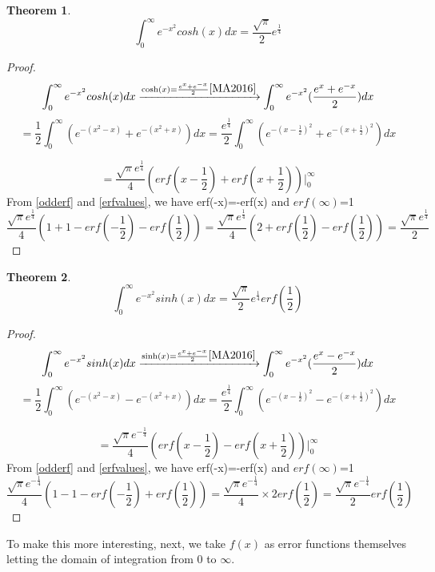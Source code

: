 \documentclass[a4paper,twoside,10pt]{article}
\newtheorem{theorem}{Theorem}[section]
\begin{document}
 \begin{theorem}
\begin{equation}
 \int_0^{\infty} e^{-x^2} cosh(x) dx = \frac{\sqrt{\pi}}{2} e^{\frac{1}{4}}    
\end{equation}
\end{theorem}
\begin{proof}
 \[ \int_0^{\infty} e^{-x^2} cosh(x) dx \xrightarrow{ \cosh(x)=\frac{e^x+e^{-x}}{2} \cite{MA2016}}  \int_0^{\infty} e^{-x^2}(\frac{e^{x}+e^{-x}}{2}) dx  \]
 \[=\frac{1}{2} \int_0^{ \infty} \left( e^{-(x^2-x)}+ e^{-(x^2+x)} \right) dx = \frac{e^{\frac{1}{4}}}{2} \int_0^{ \infty} \left( e^{-(x-\frac{1}{2})^2}+ e^{-(x+\frac{1}{2})^2} \right) dx \]

\[ =\frac{\sqrt{\pi}e^{\frac{1}{4}}}{4}  \left( erf(x-\frac{1}{2}) + erf(x+\frac{1}{2}) \right) \Big|_0^{\infty} \] 
From \eqref{odderf} and   \eqref{erfvalues}, we have erf(-x)=-erf(x)  and     $erf(\infty)  $=1 
 \[\frac{\sqrt{\pi} e^{\frac{1}{4}} }{4}  \left( 1+ 1 - erf(-\frac{1}{2})-erf(\frac{1}{2}) \right) = \frac{\sqrt{\pi} e^{\frac{1}{4}} }{4}  \left( 2 + erf(\frac{1}{2})-erf(\frac{1}{2}) \right) = \frac{\sqrt{\pi} e^{\frac{1}{4}} }{2}   \]
\end{proof}
 \begin{theorem}
\begin{equation}
 \int_0^{\infty} e^{-x^2} sinh(x) dx = \frac{\sqrt{\pi}}{2} e^{\frac{1}{4}} erf(\frac{1}{2})    
\end{equation}
\end{theorem}
\begin{proof}
 \[ \int_0^{\infty} e^{-x^2} sinh(x) dx \xrightarrow{ \sinh(x)=\frac{e^x+e^{-x}}{2} \cite{MA2016}}  \int_0^{\infty} e^{-x^2}(\frac{e^{x}-e^{-x}}{2}) dx  \]
 \[=\frac{1}{2} \int_0^{ \infty} \left( e^{-(x^2-x)}- e^{-(x^2+x)} \right) dx = \frac{e^{\frac{1}{4}}}{2} \int_0^{ \infty} \left( e^{-(x-\frac{1}{2})^2}- e^{-(x+\frac{1}{2})^2} \right) dx \]

\[ =\frac{\sqrt{\pi}e^{-\frac{1}{4}}}{4}  \left( erf(x-\frac{1}{2}) - erf(x+\frac{1}{2}) \right) \Big|_0^{\infty} \] 
From \eqref{odderf} and   \eqref{erfvalues}, we have erf(-x)=-erf(x)  and     $erf(\infty)  $=1 
 \[\frac{\sqrt{\pi} e^{-\frac{1}{4}} }{4}  \left( 1- 1 - erf(-\frac{1}{2})+erf(\frac{1}{2}) \right) = \frac{\sqrt{\pi} e^{-\frac{1}{4}} }{4}\times 2 erf(\frac{1}{2}) = \frac{\sqrt{\pi} e^{-\frac{1}{4}} }{2} erf(\frac{1}{2})   \]
 \end{proof}

 To make this more interesting, next, we take $f(x)$ as error functions themselves letting the domain of integration from 0 to   $\infty $.
 
\end{document}
